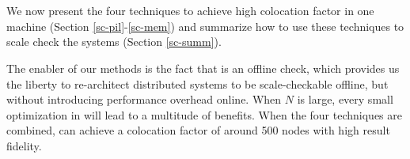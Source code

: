 \section{\sck}

We now present the four \sck techniques to achieve high colocation factor in
one machine (Section \ref{sc-pil}-\ref{sc-mem}) and summarize how to use these
techniques to scale check the systems (Section \ref{sc-summ}).

The enabler of our methods is the fact that \sck is an offline check, which
provides us the liberty to re-architect distributed systems to be
scale-checkable offline, but without introducing performance overhead online.
%
When $N$ is large, every small optimization in \sck will lead to a multitude of
benefits.
%
When the four techniques are combined, \sck can achieve a colocation factor of
around 500 nodes with high result fidelity.




